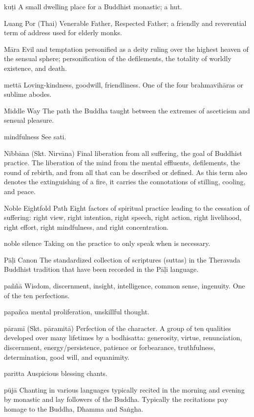 kuṭi A small dwelling place for a Buddhist monastic; a hut.

Luang Por (Thai) Venerable Father, Respected Father; a friendly and 
reverential term of address used for elderly monks.

Māra Evil and temptation personified as a deity ruling over the 
highest heaven of the sensual sphere; personification of the 
defilements, the totality of worldly existence, and death.

mettā Loving-kindness, goodwill, friendliness. One of the four 
brahmavihāras or sublime abodes.

Middle Way The path the Buddha taught between the extremes of 
asceticism and sensual pleasure.

mindfulness See sati.

Nibbāna (Skt. Nirvāna) Final liberation from all suffering, the goal 
of Buddhist practice. The liberation of the mind from the mental 
effluents, defilements, the round of rebirth, and from all that can be 
described or defined. As this term also denotes the extinguishing of a 
fire, it carries the connotations of stilling, cooling, and peace.

Noble Eightfold Path Eight factors of spiritual practice leading to the 
cessation of suffering: right view, right intention, right speech, 
right action, right livelihood, right effort, right mindfulness, and 
right concentration.

noble silence Taking on the practice to only speak when is necessary.

Pāḷi Canon The standardized collection of scriptures (suttas) in the 
Theravada Buddhist tradition that have been recorded in the Pāḷi 
language.

paññā Wisdom, discernment, insight, intelligence, common sense, 
ingenuity. One of the ten perfections.

papañca mental proliferation, unskillful thought.

pāramī (Skt. pāramitā) Perfection of the character. A group of ten 
qualities developed over many lifetimes by a bodhisatta: generosity, 
virtue, renunciation, discernment, energy/persistence, patience or 
forbearance, truthfulness, determination, good will, and equanimity.

paritta Auspicious blessing chants.

pūjā Chanting in various languages typically recited in the morning 
and evening by monastic and lay followers of the Buddha. Typically the 
recitations pay homage to the Buddha, Dhamma and Saṅgha.

